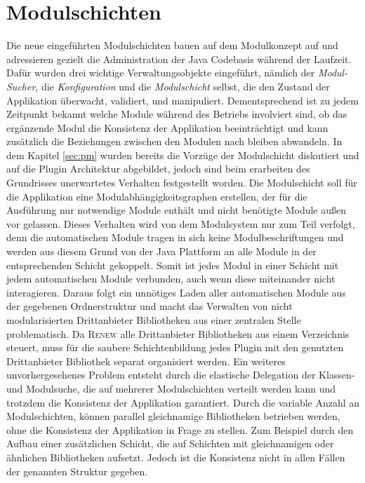 \section{Modulschichten}
Die neue eingeführten Modulschichten bauen auf dem Modulkonzept auf und adressieren gezielt die Administration der Java Codebasis während der Laufzeit. Dafür wurden drei wichtige Verwaltungsobjekte eingeführt, nämlich der \textit{Modul-Sucher}, die \textit{Konfiguration} und die \textit{Modulschicht} selbst, die den Zustand der Applikation überwacht, validiert, und manipuliert. Dementsprechend ist zu jedem Zeitpunkt bekannt welche Module während des Betriebs involviert sind, ob das ergänzende Modul die Konsistenz der Applikation beeinträchtigt und kann zusätzlich die Beziehungen zwischen den Modulen nach bleiben abwandeln. In dem Kapitel \ref{sec:pm} wurden bereits die Vorzüge der Modulschicht diskutiert und auf die Plugin Architektur abgebildet, jedoch sind beim erarbeiten des Grundrisses unerwartetes Verhalten festgestellt worden.\newline
Die Modulschicht soll für die Applikation eine Modulabhängigkeitsgraphen erstellen, der für die Ausführung nur notwendige Module enthält und nicht benötigte Module außen vor gelassen. Dieses Verhalten wird von dem Modulsystem nur zum Teil verfolgt, denn die automatischen Module tragen in sich keine Modulbeschriftungen und werden aus diesem Grund von der Java Plattform an alle Module in der entsprechenden Schicht gekoppelt. Somit ist jedes Modul in einer Schicht mit jedem automatischen Module verbunden, auch wenn diese miteinander nicht interagieren. Daraus folgt ein unnötiges Laden aller automatischen Module aus der gegebenen Ordnerstruktur und macht das Verwalten von nicht modularisierten Drittanbieter Bibliotheken aus einer zentralen Stelle problematisch. Da \textsc{Renew} alle Drittanbieter Bibliotheken aus einem Verzeichnis steuert, muss für die saubere Schichtenbildung jedes Plugin mit den genutzten Drittanbieter Bibliothek separat organisiert werden.\newline
Ein weiteres unvorhergesehenes Problem entsteht durch die elastische Delegation der Klassen- und Modulsuche, die auf mehrerer Modulschichten verteilt werden kann und trotzdem die Konsistenz der Applikation garantiert.
Durch die variable Anzahl an Modulschichten, können parallel gleichnamige Bibliotheken betrieben werden, ohne die Konsistenz der Applikation in Frage zu stellen. Zum Beispiel durch den Aufbau einer zusätzlichen Schicht, die auf Schichten mit gleichnamigen oder ähnlichen Bibliotheken aufsetzt. Jedoch ist die Konsistenz nicht in allen Fällen der genannten Struktur gegeben. \newline

